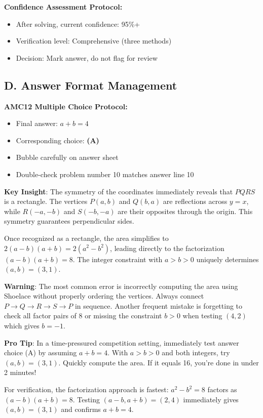 \documentclass[]{article}
\begin{document}
\begin{competitionbox}
\textbf{Confidence Assessment Protocol:}
\begin{itemize}[leftmargin=*]
    \item After solving, current confidence: 95\%+
    \item Verification level: Comprehensive (three methods)
    \item Decision: Mark answer, do not flag for review
\end{itemize}

\subsection*{D. Answer Format Management}

\textbf{AMC12 Multiple Choice Protocol:}
\begin{itemize}[leftmargin=*]
    \item Final answer: $a+b = 4$
    \item Corresponding choice: \textbf{(A)}
    \item Bubble carefully on answer sheet
    \item Double-check problem number 10 matches answer line 10
\end{itemize}
\end{competitionbox}

\begin{keyinsightbox}
\textbf{Key Insight}: The symmetry of the coordinates immediately reveals that $PQRS$ is a rectangle. The vertices $P(a,b)$ and $Q(b,a)$ are reflections across $y=x$, while $R(-a,-b)$ and $S(-b,-a)$ are their opposites through the origin. This symmetry guarantees perpendicular sides.

Once recognized as a rectangle, the area simplifies to $2(a-b)(a+b) = 2(a^2-b^2)$, leading directly to the factorization $(a-b)(a+b) = 8$. The integer constraint with $a>b>0$ uniquely determines $(a,b) = (3,1)$.
\end{keyinsightbox}

\begin{warningbox}
\textbf{Warning}: The most common error is incorrectly computing the area using Shoelace without properly ordering the vertices. Always connect $P \to Q \to R \to S \to P$ in sequence. Another frequent mistake is forgetting to check all factor pairs of 8 or missing the constraint $b>0$ when testing $(4,2)$ which gives $b=-1$.
\end{warningbox}

\begin{tipbox}
\textbf{Pro Tip}: In a time-pressured competition setting, immediately test answer choice (A) by assuming $a+b=4$. With $a>b>0$ and both integers, try $(a,b)=(3,1)$. Quickly compute the area. If it equals 16, you're done in under 2 minutes!

For verification, the factorization approach is fastest: $a^2-b^2=8$ factors as $(a-b)(a+b)=8$. Testing $(a-b, a+b) = (2,4)$ immediately gives $(a,b)=(3,1)$ and confirms $a+b=4$.
\end{tipbox}
\end{document}
